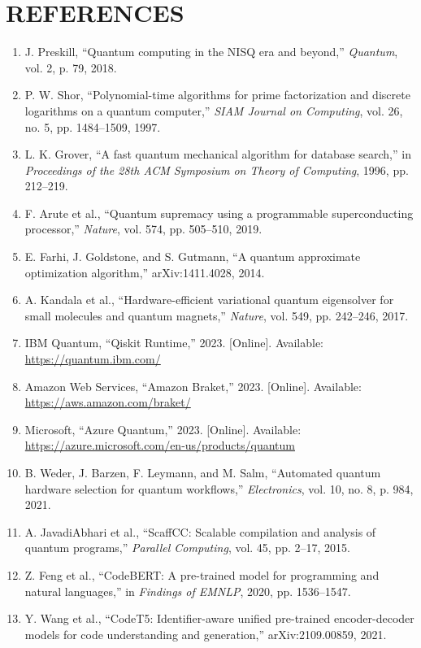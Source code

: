 \documentclass[12pt,a4paper]{report}
\begin{document}
\chapter*{REFERENCES}
\begin{enumerate}
\item J. Preskill, ``Quantum computing in the NISQ era and beyond,'' \textit{Quantum}, vol. 2, p. 79, 2018.
\item P. W. Shor, ``Polynomial-time algorithms for prime factorization and discrete logarithms on a quantum computer,'' \textit{SIAM Journal on Computing}, vol. 26, no. 5, pp. 1484--1509, 1997.
\item L. K. Grover, ``A fast quantum mechanical algorithm for database search,'' in \textit{Proceedings of the 28th ACM Symposium on Theory of Computing}, 1996, pp. 212--219.
\item F. Arute et al., ``Quantum supremacy using a programmable superconducting processor,'' \textit{Nature}, vol. 574, pp. 505--510, 2019.
\item E. Farhi, J. Goldstone, and S. Gutmann, ``A quantum approximate optimization algorithm,'' arXiv:1411.4028, 2014.
\item A. Kandala et al., ``Hardware-efficient variational quantum eigensolver for small molecules and quantum magnets,'' \textit{Nature}, vol. 549, pp. 242--246, 2017.
\item IBM Quantum, ``Qiskit Runtime,'' 2023. [Online]. Available: \url{https://quantum.ibm.com/}
\item Amazon Web Services, ``Amazon Braket,'' 2023. [Online]. Available: \url{https://aws.amazon.com/braket/}
\item Microsoft, ``Azure Quantum,'' 2023. [Online]. Available: \url{https://azure.microsoft.com/en-us/products/quantum}
\item B. Weder, J. Barzen, F. Leymann, and M. Salm, ``Automated quantum hardware selection for quantum workflows,'' \textit{Electronics}, vol. 10, no. 8, p. 984, 2021.
\item A. JavadiAbhari et al., ``ScaffCC: Scalable compilation and analysis of quantum programs,'' \textit{Parallel Computing}, vol. 45, pp. 2--17, 2015.
\item Z. Feng et al., ``CodeBERT: A pre-trained model for programming and natural languages,'' in \textit{Findings of EMNLP}, 2020, pp. 1536--1547.
\item Y. Wang et al., ``CodeT5: Identifier-aware unified pre-trained encoder-decoder models for code understanding and generation,'' arXiv:2109.00859, 2021.

\end{enumerate}
\end{document}
